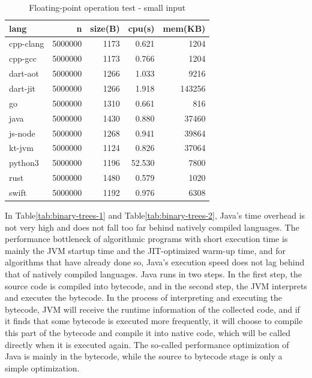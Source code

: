 \begin{table}[htbp]
    \caption{Floating-point operation test - small input}
    \label{tab:n-body-2}
    \begin{center}
        \begin{tabular}{lrrrr}
            \toprule
            lang      & n       & size(B) & cpu(s) & mem(KB) \\
            \midrule
            cpp-clang & 5000000 & 1173    & 0.621  & 1204    \\
            cpp-gcc   & 5000000 & 1173    & 0.766  & 1204    \\
            dart-aot  & 5000000 & 1266    & 1.033  & 9216    \\
            dart-jit  & 5000000 & 1266    & 1.918  & 143256  \\
            go        & 5000000 & 1310    & 0.661  & 816     \\
            java      & 5000000 & 1430    & 0.880  & 37460   \\
            js-node   & 5000000 & 1268    & 0.941  & 39864   \\
            kt-jvm    & 5000000 & 1124    & 0.826  & 37064   \\
            python3   & 5000000 & 1196    & 52.530 & 7800    \\
            rust      & 5000000 & 1480    & 0.579  & 1020    \\
            swift     & 5000000 & 1192    & 0.976  & 6308    \\
            \bottomrule
        \end{tabular}
    \end{center}
\end{table}

In Table\ref{tab:binary-trees-1} and Table\ref{tab:binary-trees-2},
Java's time overhead is not very high and does not fall too far behind natively compiled languages. The performance bottleneck of algorithmic programs with short execution time is mainly the JVM startup time and the JIT-optimized warm-up time, and for algorithms that have already done so, Java's execution speed does not lag behind that of natively compiled languages. Java runs in two steps. In the first step, the source code is compiled into bytecode, and in the second step, the JVM interprets and executes the bytecode. In the process of interpreting and executing the bytecode, JVM will receive the runtime information of the collected code, and if it finds that some bytecode is executed more frequently, it will choose to compile this part of the bytecode and compile it into native code, which will be called directly when it is executed again. The so-called performance optimization of Java is mainly in the bytecode, while the source to bytecode stage is only a simple optimization.

